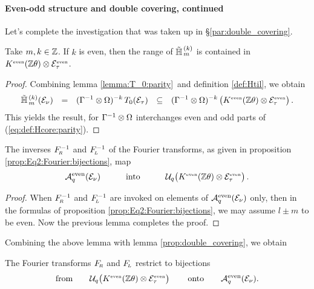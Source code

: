 \paragraph{Even-odd structure and double covering, continued}

Let's complete the investigation that was taken up in \S \ref{par:double_covering}\@.

\begin{lemma_sec}
Take\/ $m,k \in \mathbb{Z}$. If\/ $k$ is even, then the range of\/ $\tilde{\mathbb{H}}_{\,m}^{\,(k)}$
is contained in\/ $K^{\rm \scriptscriptstyle even}(\mathbb{Z} \theta) \otimes \mathcal E_\tau^{\rm \scriptscriptstyle even}$.
\end{lemma_sec}

\begin{proof}
Combining lemma \ref{lemma:T_0:parity}\ and definition \ref{def:Htil}, we obtain
$$ \Htil{m}{k}(\Hcore_\nu)
        \hspace{0.7em} = \hspace{0.7em}
   (\Gamma^{-1} \tens \Omega)^{-k} \,T_0 (\Hcore_\tau)
        \hspace{0.7em}  \subseteq  \hspace{0.7em}
   (\Gamma^{-1} \tens \Omega)^{-k}
       \left(\vertM\KZeven \tens \Hcore_\tau^\scripteven \right). $$
This yields the result, for $\Gamma^{-1} \otimes \Omega$ interchanges
even and odd parts of (\ref{eq:def:Hcore:parity}).
\end{proof}


\begin{lemma_sec}
The inverses\/ $F_{\!\scriptscriptstyle R}^{-1}$ and\/ $F_{\!\scriptscriptstyle L}^{-1}$ of the Fourier transforms,
as given in proposition \ref{prop:Eq2:Fourier:bijections}, map
$$   \Aqeven(\Hcore_\nu)
         \hspace{3em} \mbox{into}  \hspace{3em}
     \Uq \! \left(\KZeven \tens \Hcore_\tau^\scripteven \vertM\right). $$
\end{lemma_sec}
\begin{proof}
When $F_{\!\scriptscriptstyle R}^{-1}$ and $F_{\!\scriptscriptstyle L}^{-1}$ are invoked on elements of ${\mathcal A}_q^{\rm even}(\mathcal E_\nu)$ only,
then in the formulas of proposition \ref{prop:Eq2:Fourier:bijections},
we may assume $l \pm m$ to be even.
Now the previous lemma completes the proof.
\end{proof}
\vspace{2ex}


Combining the above lemma with lemma \ref{prop:double_covering}, we obtain

\begin{prop_sec}
The Fourier transforms\/ $F_{\!\scriptscriptstyle R}$ and\/ $F_{\!\scriptscriptstyle L}$ restrict to bijections
$$      \mbox{from}  \hspace{2em}
  \Uq \! \left(\KZeven \tens \Hcore_\tau^\scripteven \vertM\right)
        \hspace{2em} \mbox{onto}  \hspace{2em}
  \Aqeven(\Hcore_\nu). $$
\end{prop_sec}
